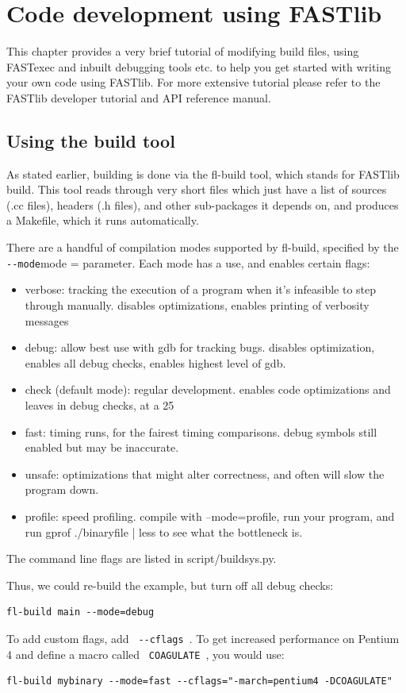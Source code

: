 \documentclass[letter]{report}
\begin{document}
\chapter {Code development using FASTlib}
 
This chapter provides a very brief tutorial of modifying build files, using FASTexec and inbuilt debugging tools etc. to help you get started with writing your own code using FASTlib. For more extensive tutorial please refer to the FASTlib developer tutorial and API reference manual.

\section {Using the build tool}

As stated earlier, building is done via the fl-build tool, which stands for FASTlib build. This tool reads through very short files which just have a list of sources (.cc files), headers (.h files), and other sub-packages it depends on, and produces a Makefile, which it runs automatically.

There are a handful of compilation modes supported by fl-build, specified by the \verb = --mode=mode = parameter. Each mode has a use, and enables certain flags:
\begin{itemize}
\item verbose: tracking the execution of a program when it's infeasible to step through manually. disables optimizations, enables printing of verbosity messages
\item debug: allow best use with gdb for tracking bugs. disables optimization, enables all debug checks, enables highest level of gdb.
\item check (default mode): regular development. enables code optimizations and leaves in debug checks, at a 25%
\item fast: timing runs, for the fairest timing comparisons. debug symbols still enabled but may be inaccurate.
\item unsafe: optimizations that might alter correctness, and often will slow the program down.
\item profile: speed profiling. compile with --mode=profile, run your program, and run gprof ./binaryfile | less to see what the bottleneck is. 
\end{itemize}
The command line flags are listed in script/buildsys.py. 

Thus, we could re-build the example, but turn off all debug checks:
\begin{verbatim}
fl-build main --mode=debug
\end{verbatim}
To add custom flags, add \verb= --cflags =. To get increased performance on Pentium 4 and define a macro called \verb= COAGULATE =, you would use:
\begin{verbatim}
fl-build mybinary --mode=fast --cflags="-march=pentium4 -DCOAGULATE"
\end{verbatim}
\end{document}
